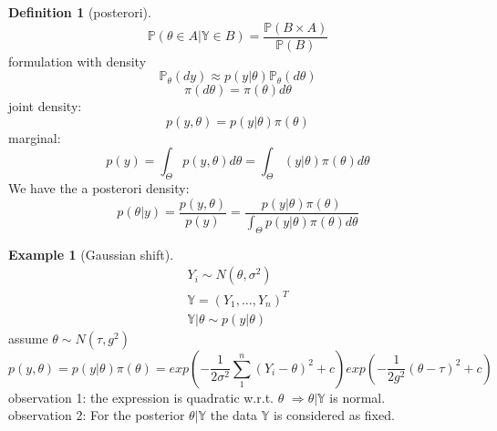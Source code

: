 \documentclass[a4paper,12pt, oneside, fleqn]{book}
\theoremstyle{definition}
\newtheorem{definition}{Definition}[section]
\newtheorem*{example}{Example}
\theoremstyle{remark}
\begin{document}
\begin{definition}[posterori]
	\begin{equation*}
		\mathbb{P}(\theta \in A | \mathbb{Y} \in B) = \frac{\mathbb{P} (B \times A)}{\mathbb{P}(B)}
	\end{equation*}
	formulation with density
	\begin{equation*}
		\mathbb{P}_\theta(dy) \approx p(y|\theta) \mathbb{P}_\theta(d\theta)
	\end{equation*}
	\begin{equation*}
		\pi(d\theta) = \pi(\theta) d\theta
	\end{equation*}
	joint density:
	\begin{equation*}
		p(y, \theta) = p(y|\theta) \pi(\theta)
	\end{equation*}
	marginal:
	\begin{equation*}
		p(y) = \int_\Theta p(y, \theta) d\theta = \int_\Theta(y|\theta) \pi(\theta)d\theta
	\end{equation*}
	We have the a posterori density:
	\begin{equation}\label{equ: apd}
		p(\theta|y) = \frac{p(y, \theta)}{p(y)} = \frac{p(y|\theta)\pi(\theta)}{\int_\Theta p(y|\theta) \pi(\theta) d\theta}
	\end{equation}
\end{definition}


\begin{example}[Gaussian shift]
\begin{align*}
	Y_i \sim N(\theta, \sigma^2)\\
	\mathbb{Y} = (Y_1, \dots, Y_n)^T\\
	\mathbb{Y}|\theta \sim p(y|\theta) 
\end{align*}
assume $\theta \sim N(\tau, g^2)$
\begin{equation*}
	p(y, \theta) = p(y|\theta) \pi(\theta) = exp(-\frac{1}{2\sigma^2} \sum_1^n (Y_i - \theta)^2 + c) exp(-\frac{1}{2g^2}(\theta-\tau)^2 + c)
\end{equation*}
observation 1: the expression is quadratic w.r.t. $\theta$ $\Rightarrow \theta|\mathbb{Y}$ is normal.\\
observation 2: For the posterior $\theta|\mathbb{Y}$ the data $\mathbb{Y}$ is considered as fixed. 
\end{example}
\end{document}
